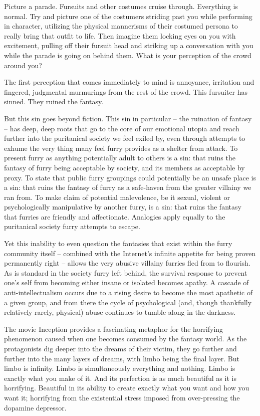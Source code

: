 Picture a parade. Fursuits and other costumes cruise through. Everything is normal. Try and picture one of the costumers striding past you while performing in character, utilizing the physical mannerisms of their costumed persona to really bring that outfit to life. Then imagine them locking eyes on you with excitement, pulling off their fursuit head and striking up a conversation with you while the parade is going on behind them. What is your perception of the crowd around you?

The first perception that comes immediately to mind is annoyance, irritation and fingered, judgmental murmurings from the rest of the crowd. This fursuiter has sinned. They ruined the fantasy.

But this sin goes beyond fiction. This sin in particular -- the ruination of fantasy -- has deep, deep roots that go to the core of our emotional utopia and reach further into the puritanical society we feel exiled by, even through attempts to exhume the very thing many feel furry provides as a shelter from attack. To present furry as anything potentially adult to others is a sin: that ruins the fantasy of furry being acceptable by society, and its members as acceptable by proxy. To state that public furry groupings could potentially be an unsafe place is a sin: that ruins the fantasy of furry as a safe-haven from the greater villainy we ran from. To make claim of potential malevolence, be it sexual, violent or psychologically manipulative by another furry, is a sin: that ruins the fantasy that furries are friendly and affectionate. Analogies apply equally to the puritanical society furry attempts to escape.

Yet this inability to even question the fantasies that exist within the furry community itself -- combined with the Internet's infinite appetite for being proven permanently right -- allows the very abusive villainy furries fled from to flourish. As is standard in the society furry left behind, the survival response to prevent one's self from becoming either insane or isolated becomes apathy. A cascade of anti-intellectualism occurs due to a rising desire to become the most apathetic of a given group, and from there the cycle of psychological (and, though thankfully relatively rarely, physical) abuse continues to tumble along in the darkness.

The movie Inception provides a fascinating metaphor for the horrifying phenomenon caused when one becomes consumed by the fantasy world. As the protagonists dig deeper into the dreams of their victim, they go further and further into the many layers of dreams, with limbo being the final layer. But limbo is infinity. Limbo is simultaneously everything and nothing. Limbo is exactly what you make of it. And its perfection is as much beautiful as it is horrifying. Beautiful in its ability to create exactly what you want and how you want it; horrifying from the existential stress imposed from over-pressing the dopamine depressor.

